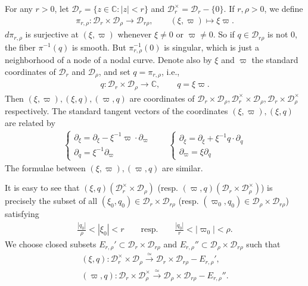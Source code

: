 \documentclass[12pt,a4paper,notitlepage]{report}
\theoremstyle{definition}
\theoremstyle{plain}
\newcommand{\mc}{\mathcal}
\newcommand{\mbb}{\mathbb}
\newcommand{\Cbb}{\mathbb C}
\numberwithin{equation}{section}
\begin{document}
For any $r>0$, let  $\mc D_r=\{z\in\mbb C:|z|<r \}$ and $\mc D_r^\times=\mc D_r-\{0\}$.\index{Dr@$\mc D_r,\mc D_r^\times$} If $r,\rho>0$, we define \index{zz@$\pi_{r,\rho}:\mc D_r\times\mc D_\rho\rightarrow\mc D_{r\rho}$}
\begin{align}
\pi_{r,\rho}:\mc D_r\times\mc D_\rho\rightarrow\mc D_{r\rho},\qquad (\xi,\varpi)\mapsto \xi\varpi.
\end{align}
$d\pi_{r,\rho}$ is surjective at $(\xi,\varpi)$ whenever $\xi\neq 0$ or $\varpi\neq 0$. So if $q\in\mc D_{r\rho}$ is not $0$, the fiber $\pi^{-1}(q)$ is smooth. But $\pi_{r,\rho}^{-1}(0)$ is singular, which is just a neighborhood of a node of a nodal curve. Denote also by $\xi$ and $\varpi$ the standard coordinates of $\mc D_r$ and $\mc D_\rho$, and set $q=\pi_{r,\rho}$, i.e.,
\begin{align*}
q:\mc D_r\times\mc D_\rho\rightarrow\Cbb,\qquad q=\xi\varpi.
\end{align*}
Then $(\xi,\varpi),(\xi,q),(\varpi,q)$ are coordinates  of $\mc D_r\times \mc D_\rho,\mc D_r^\times\times \mc D_\rho,\mc D_r\times \mc D_\rho^\times$ respectively. The standard tangent vectors of the coordinates $(\xi,\varpi),(\xi,q)$ are related by
\begin{gather}
\left\{ \begin{array}{l}
\partial_\xi=\partial_\xi-\xi^{-1}\varpi\cdot\partial_\varpi\\
\partial_q=\xi^{-1}\partial_\varpi
\end{array} \right.
\qquad
\left\{ \begin{array}{l}
\partial_\xi=\partial_\xi+\xi^{-1}q\cdot\partial_q\\
\partial_\varpi=\xi\partial_q
\end{array} \right.\label{eq74}
\end{gather}
The formulae between $(\xi,\varpi),(\varpi,q)$ are similar.


It is easy to see that  $(\xi,q)(\mc D_r^\times\times\mc D_\rho)$ (resp. $(\varpi,q)(\mc D_r\times\mc D_\rho^\times)$) is precisely the subset of all $(\xi_0,q_0)\in\mc D_r\times\mc D_{r\rho}$ (resp. $(\varpi_0,q_0)\in\mc D_\rho\times\mc D_{r\rho}$) satisfying
\begin{align}
\frac{|q_0|}{\rho}<|\xi_0|<r\qquad\text{resp.}\qquad  \frac{|q_0|}{r}<|\varpi_0|<\rho.\label{eq181}
\end{align}
We choose closed subsets $E_{r,\rho}'\subset \mc D_r\times\mc D_{r\rho}$ and $E_{r,\rho}''\subset\mc D_\rho\times\mc D_{r\rho}$ such that
\begin{gather}
(\xi,q):\mc D_r^\times\times\mc D_\rho\xrightarrow{\simeq}\mc D_r\times\mc D_{r\rho}-E_{r,\rho}',\nonumber\\
(\varpi,q): \mc D_r\times\mc D_\rho^\times\xrightarrow{\simeq}\mc D_\rho\times\mc D_{r\rho}-E_{r,\rho}''.\label{eq18}
\end{gather}
\end{document}
